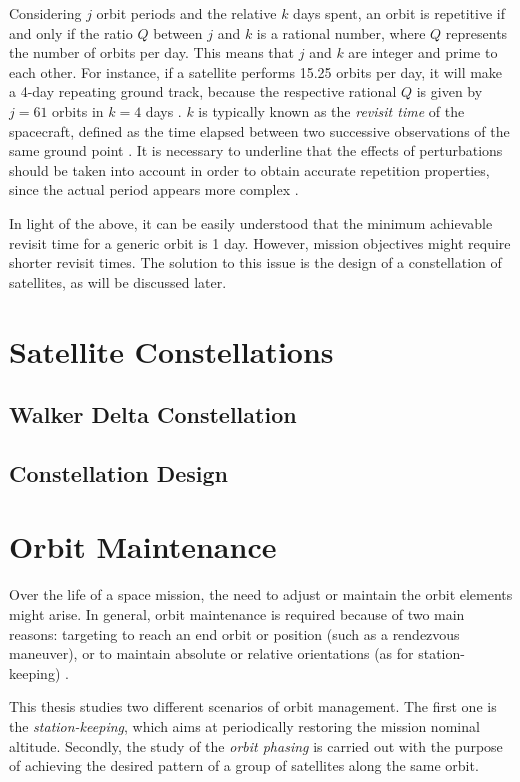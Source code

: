 Considering $j$ orbit periods and the relative $k$ days spent, an orbit is repetitive if and only if the ratio $Q$ between $j$ and $k$ is a rational number, where $Q$ represents the number of orbits per day.
This means that $j$ and $k$ are integer and prime to each other.
For instance, if a satellite performs 15.25 orbits per day, it will make a 4-day repeating ground track, because the respective rational $Q$ is given by $j=61$ orbits in $k=4$ days \cite{wertz2009orbit}.
$k$ is typically known as the \textit{revisit time} of the spacecraft, defined as the time elapsed between two successive observations of the same ground point \cite{luo2017novel}.
It is necessary to underline that the effects of perturbations should be taken into account in order to obtain accurate repetition properties, since the actual period appears more complex \cite{wertz2009orbit}. 

In light of the above, it can be easily understood that the minimum achievable revisit time for a generic orbit is 1 day.
However, mission objectives might require shorter revisit times.
The solution to this issue is the design of a constellation of satellites, as will be discussed later.



\section{Satellite Constellations}
\subsection{Walker Delta Constellation}
\subsection{Constellation Design}

\section{Orbit Maintenance}
Over the life of a space mission, the need to adjust or maintain the orbit elements might arise. In general, orbit maintenance is required because of two main reasons:
 targeting to reach an end orbit or position (such as a rendezvous maneuver), or to maintain absolute or relative orientations (as for station-keeping) \cite{wertz2009orbit}.

This thesis studies two different scenarios of orbit management. The first one is the \textit{station-keeping}, which aims at periodically restoring the mission nominal altitude. 
Secondly, the study of the \textit{orbit phasing} is carried out with the purpose of achieving the desired pattern of a group of satellites along the same orbit.


